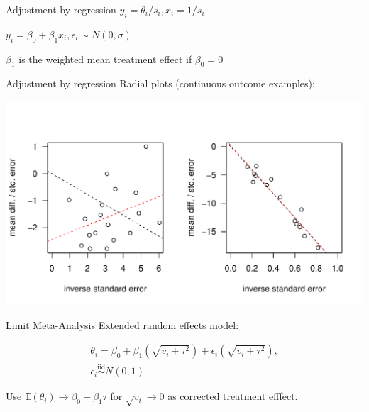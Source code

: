 \documentclass[english]{beamer}\usepackage[]{graphicx}\usepackage[]{color}
\makeatletter
\def\maxwidth{ %
  \ifdim\Gin@nat@width>\linewidth
    \linewidth
  \else
    \Gin@nat@width
  \fi
}
\newenvironment{knitrout}{}{} %
\makeatother
\begin{document}
\begin{frame}{Adjustment by regression}
$y_i = \theta_i/s_i, x_i = 1/s_i$

$y_i = \beta_0 + \beta_1 x_i, \epsilon_i \sim N(0, \sigma)$

$\beta_1$ is the weighted mean treatment effect if $\beta_0 = 0$
\end{frame}


\begin{frame}{Adjustment by regression}
Radial plots (continuous outcome examples):

\vspace{-1.1cm}

\begin{knitrout}
\color{fgcolor}
\includegraphics[width=\maxwidth]{figure/unnamed-chunk-8-1} 

\end{knitrout}
\end{frame}



\begin{frame}[fragile]{Limit Meta-Analysis}
Extended random effects model:

\vspace{-4mm}
\begin{align}
\theta_i = \beta_0 + \beta_1(\sqrt{v_i + \tau^2}) + \epsilon_i(\sqrt{v_i + \tau^2}), \nonumber \\
\epsilon_{i} \stackrel{\textrm{iid}}{\sim} N(0,1) \nonumber
\end{align}

Use $\mathbb{E}(\theta_{i}) \rightarrow \beta_{0} + \beta_{1}\tau$ for $\sqrt{v_{i}} \rightarrow 0$
as corrected treatment efffect.
\end{frame}
\end{document}
